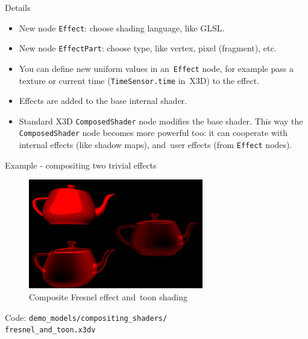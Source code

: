 \documentclass{beamer}
\begin{document}
\begin{frame}{Details}
\begin{itemize}
  \item New node \texttt{Effect}: choose shading language, like GLSL.
  \item New node \texttt{EffectPart}: choose type, like vertex, pixel (fragment), etc.
  \item You can define new uniform values in an~\texttt{Effect} node,
    for example pass a texture or current time (\texttt{TimeSensor.time} in~X3D)
    to the effect.
  \item Effects are added to the base internal shader.
  \item Standard X3D \texttt{ComposedShader} node modifies the base shader.
    This way the \texttt{ComposedShader} node becomes more powerful too:
    it can cooperate with internal effects (like shadow maps),
    and~user effects (from \texttt{Effect} nodes).
\end{itemize}
\end{frame}

\begin{frame}{Example - compositing two trivial effects}
\begin{figure}
  \centering
  \includegraphics[width=3.0in]{../fresnel_and_toon}
  \caption{Composite Fresnel effect and~toon shading}
\end{figure}

Code: \texttt{demo\_models/compositing\_shaders/\\fresnel\_and\_toon.x3dv}

\end{frame}
\end{document}
